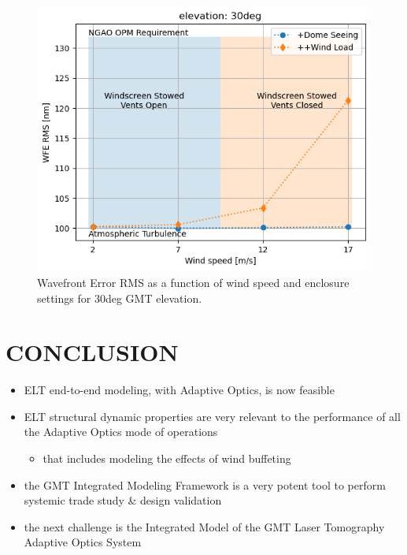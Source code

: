 \documentclass[]{AO4ELT}  %
\begin{document}
\begin{figure}
   \centering
   \includegraphics[width=0.5\linewidth]{wfe-rms_el30.png}
   \caption{Wavefront Error RMS as a function of wind speed and enclosure settings for 30deg GMT elevation.}
   \label{fig:18c}
\end{figure}

\clearpage

\section{CONCLUSION}
\label{sec:conclusion}

\begin{itemize}
   \item ELT end-to-end modeling, with Adaptive Optics, is now feasible
   \item ELT structural dynamic properties are very relevant to the performance of all the Adaptive Optics mode of operations
         \begin{itemize}
            \item that includes modeling the effects of wind buffeting
         \end{itemize}
   \item the GMT Integrated Modeling Framework is a very potent tool to perform systemic trade study \& design validation
   \item the next challenge is the Integrated Model of the GMT Laser Tomography Adaptive Optics System
\end{itemize}

\printbibliography %
\end{document}

